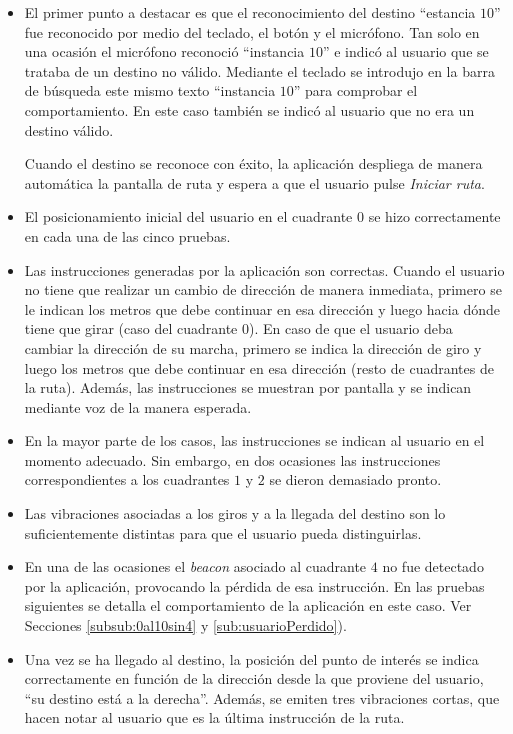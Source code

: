 \begin{itemize}
	
	\item El primer punto a destacar es que el reconocimiento del destino ``estancia $10$'' fue reconocido por medio del teclado, el botón y el micrófono. Tan solo en una ocasión el micrófono reconoció ``instancia $10$'' e indicó al usuario que se trataba de un destino no válido. Mediante el teclado se introdujo en la barra de búsqueda este mismo texto ``instancia $10$'' para comprobar el comportamiento. En este caso también se indicó al usuario que no era un destino válido. 
	
	Cuando el destino se reconoce con éxito, la aplicación despliega de manera automática la pantalla de ruta y espera a que el usuario pulse \textit{Iniciar ruta}. 
	
	\item El posicionamiento inicial del usuario en el cuadrante $0$ se hizo correctamente en cada una de las cinco pruebas.
	
	\item Las instrucciones generadas por la aplicación son correctas. Cuando el usuario no tiene que realizar un cambio de dirección de manera inmediata, primero se le indican los metros que debe continuar en esa dirección y luego hacia dónde tiene que girar (caso del cuadrante $0$). En caso de que el usuario deba cambiar la dirección de su marcha, primero se indica la dirección de giro y luego los metros que debe continuar en esa dirección (resto de cuadrantes de la ruta). Además, las instrucciones se muestran por pantalla y se indican mediante voz de la manera esperada.
	
	\item En la mayor parte de los casos, las instrucciones se indican al usuario en el momento adecuado. Sin embargo, en dos ocasiones las instrucciones correspondientes a los cuadrantes $1$ y $2$ se dieron demasiado pronto. 
	
	\item Las vibraciones asociadas a los giros y a la llegada del destino son lo suficientemente distintas para que el usuario pueda distinguirlas.
	
	\item En una de las ocasiones el \textit{beacon} asociado al cuadrante $4$ no fue detectado por la aplicación, provocando la pérdida de esa instrucción. En las pruebas siguientes se detalla el comportamiento de la aplicación en este caso. Ver Secciones \ref{subsub:0al10sin4} y \ref{sub:usuarioPerdido}).
	
	\item Una vez se ha llegado al destino, la posición del punto de interés se indica correctamente en función de la dirección desde la que proviene del usuario, ``su destino está a la derecha''. Además, se emiten tres vibraciones cortas, que hacen notar al usuario que es la última instrucción de la ruta.
	
\end{itemize}

